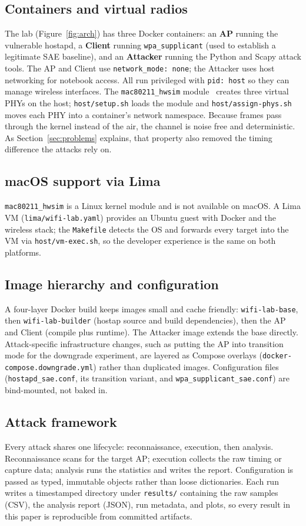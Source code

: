 \documentclass[11pt,letterpaper]{article}
\newcommand{\code}[1]{\texttt{\small #1}}
\begin{document}
\subsection{Containers and virtual radios}
The lab (Figure~\ref{fig:arch}) has three Docker containers: an \textbf{AP}
running the vulnerable hostapd, a \textbf{Client} running \code{wpa\_supplicant}
(used to establish a legitimate SAE baseline), and an \textbf{Attacker} running
the Python and Scapy attack tools. The AP and Client use \code{network\_mode:
none}; the Attacker uses host networking for notebook access. All run privileged
with \code{pid: host} so they can manage wireless interfaces. The
\code{mac80211\_hwsim} module~\cite{mac80211_hwsim} creates three virtual PHYs on
the host; \code{host/setup.sh} loads the module and \code{host/assign-phys.sh}
moves each PHY into a container's network namespace. Because frames pass through
the kernel instead of the air, the channel is noise free and deterministic. As
Section~\ref{sec:problems} explains, that property also removed the timing
difference the attacks rely on.

\subsection{macOS support via Lima}
\code{mac80211\_hwsim} is a Linux kernel module and is not available on macOS. A
Lima VM (\code{lima/wifi-lab.yaml}) provides an Ubuntu guest with Docker and the
wireless stack; the \code{Makefile} detects the OS and forwards every target into
the VM via \code{host/vm-exec.sh}, so the developer experience is the same on
both platforms.

\subsection{Image hierarchy and configuration}
A four-layer Docker build keeps images small and cache friendly:
\code{wifi-lab-base}, then \code{wifi-lab-builder} (hostap source and build
dependencies), then the AP and Client (compile plus runtime). The Attacker image
extends the base directly. Attack-specific infrastructure changes, such as
putting the AP into transition mode for the downgrade experiment, are layered as
Compose overlays (\code{docker-compose.downgrade.yml}) rather than duplicated
images. Configuration files (\code{hostapd\_sae.conf}, its transition variant,
and \code{wpa\_supplicant\_sae.conf}) are bind-mounted, not baked in.

\subsection{Attack framework}
Every attack shares one lifecycle: reconnaissance, execution, then analysis.
Reconnaissance scans for the target AP; execution collects the raw timing or
capture data; analysis runs the statistics and writes the report. Configuration
is passed as typed, immutable objects rather than loose dictionaries. Each run
writes a timestamped directory under \code{results/} containing the raw samples
(CSV), the analysis report (JSON), run metadata, and plots, so every result in
this paper is reproducible from committed artifacts.
\end{document}

